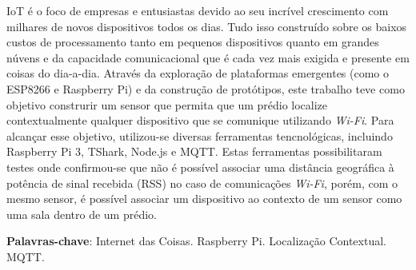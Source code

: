 \setlength{\absparsep}{18pt} %
\begin{resumo}

	IoT é o foco de empresas e entusiastas devido ao seu incrível crescimento com
	milhares de novos dispositivos todos os dias. Tudo isso construído sobre os
	baixos custos de processamento tanto em pequenos dispositivos quanto em
	grandes núvens e da capacidade comunicacional que é cada vez mais exigida e
	presente em coisas do dia-a-dia.
	Através da exploração de plataformas emergentes (como o ESP8266 e Raspberry
	Pi) e da construção de protótipos, este trabalho teve como objetivo
	construrir um sensor que permita que um prédio localize contextualmente
	qualquer dispositivo que se comunique utilizando \emph{Wi-Fi}. Para
	alcançar esse objetivo, utilizou-se diversas ferramentas tencnológicas,
	incluindo Raspberry Pi 3, TShark, Node.js e MQTT. Estas ferramentas
	possibilitaram testes onde confirmou-se que não é possível associar uma
	distância geográfica à potência de sinal recebida (RSS) no caso de
	comunicações \emph{Wi-Fi}, porém, com o mesmo sensor, é possível associar um
	dispositivo ao contexto de um sensor como uma sala dentro de um prédio.

	\textbf{Palavras-chave}: Internet das Coisas. Raspberry Pi. Localização Contextual. MQTT.
\end{resumo}
